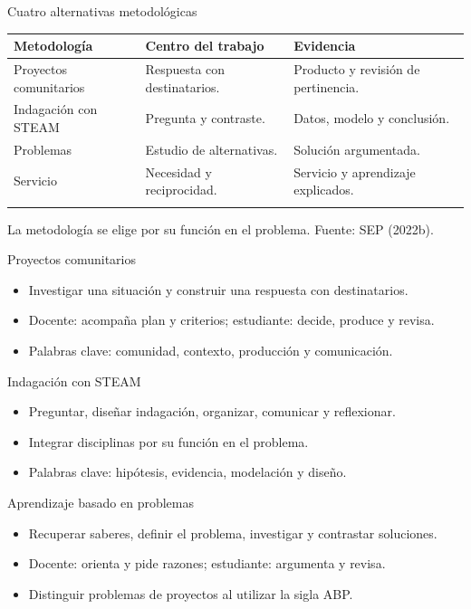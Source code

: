 \documentclass[
	spanish,
	aspectratio=1610,
	xcolor={dvipsnames,table}
]{beamer}
\begin{document}
\begin{frame}{Cuatro alternativas metodológicas}
\small\renewcommand{\arraystretch}{1.45}\begin{tabularx}{\linewidth}{X|X|X}\toprule
\textbf{Metodología} & \textbf{Centro del trabajo} & \textbf{Evidencia}\\\midrule
Proyectos comunitarios & Respuesta con destinatarios. & Producto y revisión de pertinencia.\\\addlinespace
Indagación con STEAM & Pregunta y contraste. & Datos, modelo y conclusión.\\\addlinespace
Problemas & Estudio de alternativas. & Solución argumentada.\\\addlinespace
Servicio & Necesidad y reciprocidad. & Servicio y aprendizaje explicados.\\\addlinespace
\bottomrule\end{tabularx}\par\vspace{.25cm}\small La metodología se elige por su función en el problema. Fuente: SEP (2022b).
\end{frame}
\begin{frame}{Proyectos comunitarios}
\fontsize{14}{18}\selectfont\begin{itemize}\setlength{\itemsep}{.45cm}
\item Investigar una situación y construir una respuesta con destinatarios.
\item Docente: acompaña plan y criterios; estudiante: decide, produce y revisa.
\item Palabras clave: comunidad, contexto, producción y comunicación.
\end{itemize}
\end{frame}
\begin{frame}{Indagación con STEAM}
\fontsize{14}{18}\selectfont\begin{itemize}\setlength{\itemsep}{.45cm}
\item Preguntar, diseñar indagación, organizar, comunicar y reflexionar.
\item Integrar disciplinas por su función en el problema.
\item Palabras clave: hipótesis, evidencia, modelación y diseño.
\end{itemize}
\end{frame}
\begin{frame}{Aprendizaje basado en problemas}
\fontsize{14}{18}\selectfont\begin{itemize}\setlength{\itemsep}{.45cm}
\item Recuperar saberes, definir el problema, investigar y contrastar soluciones.
\item Docente: orienta y pide razones; estudiante: argumenta y revisa.
\item Distinguir problemas de proyectos al utilizar la sigla ABP.
\end{itemize}
\end{frame}
\end{document}
